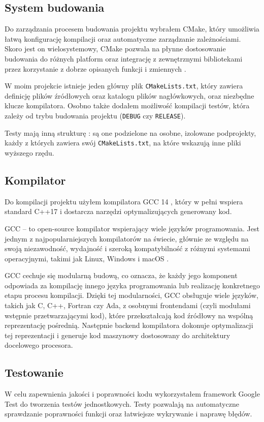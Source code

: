 \subsection{System budowania}
Do zarządzania procesem budowania projektu wybrałem CMake, który umożliwia łatwą konfigurację kompilacji oraz automatyczne zarządzanie zależnościami. Skoro jest on wielosystemowy, CMake pozwala na płynne dostosowanie budowania do różnych platform oraz integrację z zewnętrznymi bibliotekami przez korzystanie z dobrze opisanych funkcji i zmiennych \cite{cmake}.

W moim projekcie istnieje jeden główny plik \texttt{CMakeLists.txt}, który zawiera definicję plików źródłowych oraz katalogu plików nagłówkowych, oraz niezbędne klucze kompilatora. Osobno także dodałem możliwość kompilacji testów, która zależy od trybu budowania projektu (\texttt{DEBUG} czy \texttt{RELEASE}).

Testy mają inną strukturę : są one podzielone na osobne, izolowane podprojekty, każdy z których zawiera swój \texttt{CMakeLists.txt}, na które wskazują inne pliki wyższego rzędu.

\subsection{Kompilator}
Do kompilacji projektu użyłem kompilatora GCC 14 \cite{gcc_14}, który w pełni wspiera standard C++17 i dostarcza narzędzi optymalizujących generowany kod.

GCC  -- to open-source kompilator wspierający wiele języków programowania. Jest jednym z najpopularniejszych kompilatorów na świecie, głównie ze względu na swoją niezawodność, wydajność i szeroką kompatybilność z różnymi systemami operacyjnymi, takimi jak Linux, Windows i macOS \cite{gcc}. 

GCC cechuje się modularną budową, co oznacza, że każdy jego komponent odpowiada za kompilację innego języka programowania lub realizację konkretnego etapu procesu kompilacji. Dzięki tej modularności, GCC obsługuje wiele języków, takich jak C, C++, Fortran czy Ada, z osobnymi frontendami (czyli modułami wstępnie przetwarzającymi kod), które przekształcają kod źródłowy na wspólną reprezentację pośrednią. Następnie backend kompilatora dokonuje optymalizacji tej reprezentacji i generuje kod maszynowy dostosowany do architektury docelowego procesora.

\subsection{Testowanie}
W celu zapewnienia jakości i poprawności kodu wykorzystałem framework Google Test do tworzenia testów jednostkowych. Testy pozwalają na automatyczne sprawdzanie poprawności funkcji oraz łatwiejsze wykrywanie i naprawę błędów.

